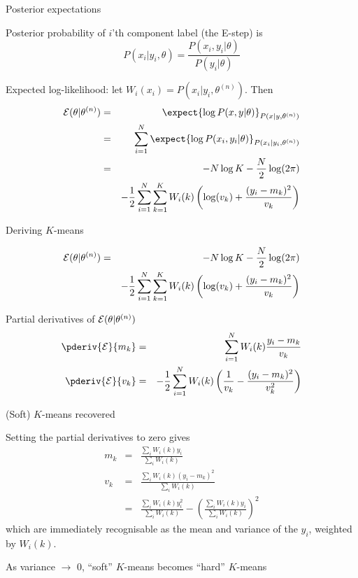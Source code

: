 \documentclass{beamer}
\begin{document}
\begin{frame}{Posterior expectations}

\itemb
 \item Posterior probability of $i$'th component label (the E-step) is
\[
P(x_i|y_i,\theta) = \frac{P(x_i,y_i|\theta)}{P(y_i|\theta)}
\]
 \item Expected log-likelihood: let $W_i(x_i) = P(x_i|y_i,\theta^{(n)})$. Then
\begin{eqnarray*}
{\cal E}(\theta|\theta^{(n)}) & = & \expect{\log P(x,y|\theta)}_{P(x|y,\theta^{(n)})} \\
& = & \sum_{i=1}^N \expect{\log P(x_i,y_i|\theta)}_{P(x_i|y_i,\theta^{(n)})} \\
& = & -N \log K - \frac{N}{2} \log (2\pi) \\
& & - \frac{1}{2} \sum_{i=1}^N \sum_{k=1}^K W_i(k) \left( \log (v_k) + \frac{(y_i-m_k)^2}{v_k} \right) \\
\end{eqnarray*}
\iteme
\end{frame}

\begin{frame}{Deriving $K$-means}

\begin{eqnarray*}
{\cal E}(\theta|\theta^{(n)}) & = &  -N \log K - \frac{N}{2} \log (2\pi) \\
& & - \frac{1}{2} \sum_{i=1}^N \sum_{k=1}^K W_i(k) \left( \log (v_k) + \frac{(y_i-m_k)^2}{v_k} \right) \\
\end{eqnarray*}

Partial derivatives of ${\cal E}(\theta|\theta^{(n)})$
\begin{eqnarray*}
\pderiv{{\cal E}}{m_k} & = & \sum_{i=1}^N W_i(k) \frac{y_i - m_k}{v_k} \\
\pderiv{{\cal E}}{v_k} & = & -\frac{1}{2} \sum_{i=1}^N W_i(k) \left( \frac{1}{v_k} - \frac{(y_i-m_k)^2}{v_k^2} \right)
\end{eqnarray*}

\end{frame}

\begin{frame}{(Soft) $K$-means recovered}

\itemb
 \item Setting the partial derivatives to zero gives
\begin{eqnarray*}
m_k & = & \frac{\sum_i W_i(k) y_i}{\sum_i W_i(k)} \\
v_k & = & \frac{\sum_i W_i(k) (y_i - m_k)^2}{\sum_i W_i(k)} \\
& = & \frac{\sum_i W_i(k) y_i^2}{\sum_i W_i(k)} - \left( \frac{\sum_i W_i(k) y_i}{\sum_i W_i(k)} \right)^2
\end{eqnarray*}
which are immediately recognisable as the mean and variance of the $y_i$, weighted by $W_i(k)$.
\item As variance $\to$ 0, ``soft'' $K$-means becomes ``hard'' $K$-means
\iteme
\end{frame}
\end{document}
